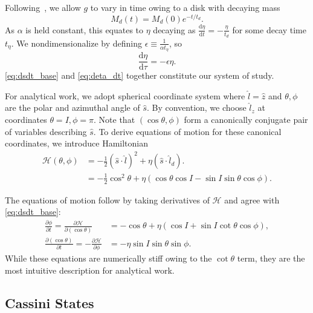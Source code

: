 \documentclass[
        fleqn,
        usenatbib,
    ]{mnras}
\newcommand*{\rd}[2]{\frac{\mathrm{d}#1}{\mathrm{d}#2}}
\newcommand*{\pd}[2]{\frac{\partial#1}{\partial#2}}
\newcommand*{\p}[1]{\left(#1\right)}
\begin{document}
Following~\cite{millholland_disk}, we allow $g$ to vary in time owing to a
disk with decaying mass
\begin{equation}
    M_d(t) = M_d(0)e^{-t/t_d}.
\end{equation}
As $\alpha$ is held constant, this equates to $\eta$ decaying as $\rd{\eta}{t} =
-\frac{\eta}{t_d}$ for some decay time $t_\eta$. We nondimensionalize by
defining $\epsilon \equiv \frac{1}{\alpha t_\eta}$, so
\begin{equation}
    \rd{\eta}{\tau} = -\epsilon \eta.\label{eq:deta_dt}
\end{equation}
\autoref{eq:dsdt_base} and \autoref{eq:deta_dt} together constitute our system
of study.

For analytical work, we adopt spherical coordinate system where $\hat{l} =
\hat{z}$ and $\theta, \phi$ are the polar and azimuthal angle of $\hat{s}$. By
convention, we choose $\hat{l}_z$ at coordinates $\theta = I, \phi = \pi$.
Note that $\p{\cos \theta, \phi}$ form a canonically conjugate pair of variables
describing $\hat{s}$. To derive equations of motion for these canonical
coordinates, we introduce Hamiltonian
\begin{align}
    \mathcal{H}\p{\theta, \phi} &= -\frac{1}{2}\p{\hat{s} \cdot \hat{l}}^2
            + \eta \p{\hat{s} \cdot \hat{l}_d}.\label{eq:H}\\
        &= -\frac{1}{2}\cos^2\theta
            + \eta \p{\cos \theta \cos I - \sin I \sin \theta \cos \phi}.
\end{align}

The equations of motion follow by taking derivatives of $\mathcal{H}$ and agree
with \autoref{eq:dsdt_base}:
\begin{subequations}\label{se:H_eom}
    \begin{align}
        \pd{\phi}{t} = \pd{\mathcal{H}}{(\cos\theta)}
            &= -\cos\theta + \eta\p{\cos I + \sin I \cot \theta \cos \phi},\\
        \pd{(\cos \theta)}{t} = -\pd{\mathcal{H}}{\phi}
            &= -\eta \sin I \sin \theta \sin \phi.
    \end{align}
\end{subequations}
While these equations are numerically stiff owing to the $\cot\theta$ term, they
are the most intuitive description for analytical work.

\subsection{Cassini States}\label{ss:cs}
\end{document}
